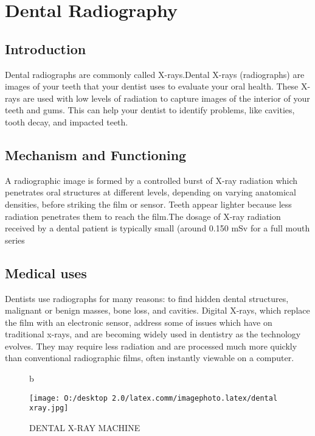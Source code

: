 \documentclass[12pt]{article}
\begin{document}
\section{Dental Radiography}


\subsection{Introduction}Dental radiographs are commonly called X-rays.Dental X-rays (radiographs) are images of your teeth that your dentist uses to evaluate your oral health. These X-rays are used with low levels of radiation to capture images of the interior of your teeth and gums. This can help your dentist to identify problems, like cavities, tooth decay, and impacted teeth.


\subsection{Mechanism and Functioning}A radiographic image is formed by a controlled burst of X-ray radiation which penetrates oral structures at different levels, depending on varying anatomical densities, before striking the film or sensor. Teeth appear lighter because less radiation penetrates them to reach the film.The dosage of X-ray radiation received by a dental patient is typically small (around 0.150 mSv for a full mouth series
\newpage

 

\subsection{Medical uses} Dentists use radiographs for many reasons: to find hidden dental structures, malignant or benign masses, bone loss, and cavities.\newline 
Digital X-rays, which replace the film with an electronic sensor, address some of  issues which have on traditional x-rays, and are becoming widely used in dentistry as the technology evolves. They may require less radiation and are processed much more quickly than conventional radiographic films, often instantly viewable on a computer.


\begin{figure}{b}

\centering
\texttt{[image: O:/desktop 2.0/latex.comm/imagephoto.latex/dental xray.jpg]}
\caption{DENTAL X-RAY MACHINE}
\end{figure}
\end{document}
